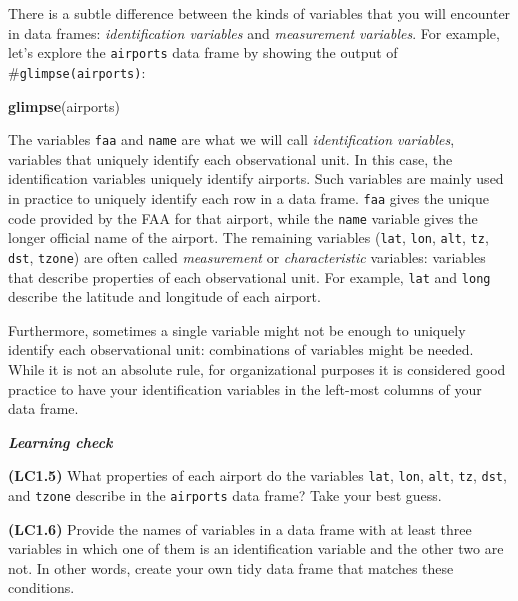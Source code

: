 \documentclass[]{book}
\newenvironment{Shaded}{\begin{snugshade}}{\end{snugshade}}
\newcommand{\KeywordTok}[1]{\textcolor[rgb]{0.13,0.29,0.53}{\textbf{#1}}}
\newcommand{\NormalTok}[1]{#1}
\begin{document}
There is a subtle difference between the kinds of variables that you will encounter in data frames: \emph{identification variables} and \emph{measurement variables}. For example, let's explore the \texttt{airports} data frame by showing the output of \#\texttt{glimpse(airports)}:

\begin{Shaded}
\begin{Highlighting}[]
\KeywordTok{glimpse}\NormalTok{(airports)}
\end{Highlighting}
\end{Shaded}

The variables \texttt{faa} and \texttt{name} are what we will call \emph{identification variables}, variables that uniquely identify each observational unit. In this case, the identification variables uniquely identify airports. Such variables are mainly used in practice to uniquely identify each row in a data frame. \texttt{faa} gives the unique code provided by the FAA for that airport, while the \texttt{name} variable gives the longer official name of the airport. The remaining variables (\texttt{lat}, \texttt{lon}, \texttt{alt}, \texttt{tz}, \texttt{dst}, \texttt{tzone}) are often called \emph{measurement} or \emph{characteristic} variables: variables that describe properties of each observational unit. For example, \texttt{lat} and \texttt{long} describe the latitude and longitude of each airport.

Furthermore, sometimes a single variable might not be enough to uniquely identify each observational unit: combinations of variables might be needed. While it is not an absolute rule, for organizational purposes it is considered good practice to have your identification variables in the left-most columns of your data frame.

\begin{learncheck}
\vspace{-0.25in}

\textbf{\emph{Learning check}} \vspace{-0.25in}
\end{learncheck}

\textbf{(LC1.5)} What properties of each airport do the variables \texttt{lat}, \texttt{lon}, \texttt{alt}, \texttt{tz}, \texttt{dst}, and \texttt{tzone} describe in the \texttt{airports} data frame? Take your best guess.

\textbf{(LC1.6)} Provide the names of variables in a data frame with at least three variables in which one of them is an identification variable and the other two are not. In other words, create your own tidy data frame that matches these conditions.
\end{document}
